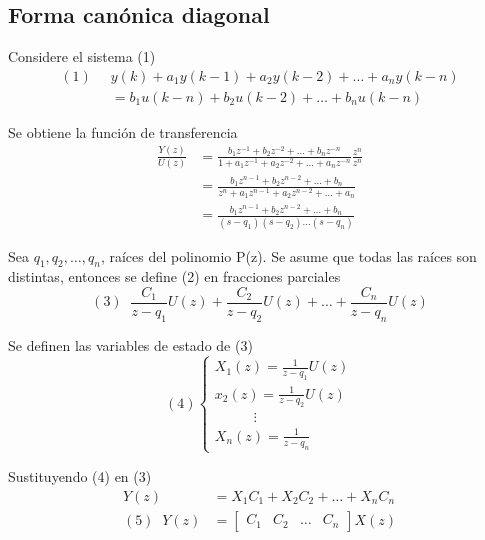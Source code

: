 \subsection{Forma canónica diagonal}

Considere el sistema (1)
\[
    \begin{split}
        (1) \;\; & y(k) + a_{1}y(k-1) + a_{2}y(k-2) + \ldots + a_{n}y(k-n) \\
            & = b_{1}u(k-n) + b_{2}u(k-2) + \ldots + b_{n}u(k-n)
    \end{split}
\]

Se obtiene la función de transferencia 
\[
    \begin{split}
        \frac{Y(z)}{U(z)} & = \frac{b_{1}z^{-1} + b_{2}z^{-2} + \ldots + b_{n}z^{-n}}{1 + a_{1}z^{-1} + a_{2}z^{-2} + \ldots + a_{n}z^{-n}} \frac{z^{n}}{z^{n}}\\ \;\;
        & = \frac{b_{1}z^{n-1} + b_{2}z^{n-2} + \ldots + b_{n}}{z^{n} + a_{1}z^{n-1} + a_{2}z^{n-2} + \ldots + a_{n}} \\
        & = \frac{b_{1}z^{n-1} + b_{2}z^{n-2} + \ldots + b_{n}}{(s-q_{1})(s-q_{2}) \ldots (s-q_{n})}
    \end{split}
\]

Sea \( q_{1}, q_{2}, \ldots, q_{n} \), raíces del polinomio P(z). Se asume que todas las raíces son distintas, entonces se define (2) en fracciones parciales
\[
    (3) \;\;
    \frac{C_{1}}{z-q_{1}}U(z) + \frac{C_{2}}{z-q_{2}}U(z) + \ldots + \frac{C_{n}}{z-q_{n}}U(z)
\]

Se definen las variables de estado de (3)
\[(4)
    \left\{
        \begin{array}{lll}
            X_{1}(z) = \frac{1}{z-q_{1}}U(z) \\ 
            x_{2}(z) = \frac{1}{z-q_{2}}U(z) \\
            \;\;\;\;\;\;\;\;\;\; \vdots \\
            X_{n}(z) = \frac{1}{z-q_{n}}
        \end{array}
    \right.
\]

Sustituyendo (4) en (3)
\[
    \begin{split}
        Y(z) & = X_{1}C_{1} + X_{2}C_{2} + \ldots + X_{n}C_{n} \\
        (5) \;\; Y(z) & = 
        \begin{bmatrix}
            C_{1} & C_{2} & \ldots & C_{n} 
        \end{bmatrix} X(z)
    \end{split}
\]

